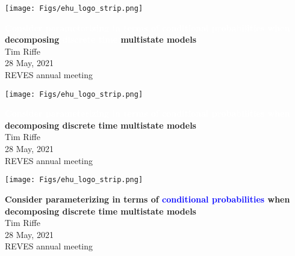 \documentclass[20pt,usenames,dvipsnames]{beamer}
\newcommand{\white}[1]{\textcolor{white}{#1}}
\newcommand{\blue}[1]{\textcolor{blue}{#1}}
\begin{document}

\begin{frame}[plain]
	\vspace{.5cm}
 \centerline{\texttt{[image: Figs/ehu\_logo\_strip.png]}}

	\huge
	\vspace{1em}
	\textbf{\white{Consider parameterizing in terms of conditional probabilities when} decomposing \white{discrete time} multistate models}\\
	\vspace{1em}
	\large 
	Tim Riffe \\
	\vspace{1em}
	28 May, 2021\\
	REVES annual meeting
\end{frame}

\begin{frame}[plain]
	\vspace{.5cm}
 \centerline{\texttt{[image: Figs/ehu\_logo\_strip.png]}}

	\huge
	\vspace{1em}
	\textbf{\white{Consider parameterizing in terms of conditional probabilities when} decomposing discrete time multistate models}\\
	\vspace{1em}
	\large 
	Tim Riffe \\
	\vspace{1em}
	28 May, 2021\\
	REVES annual meeting
\end{frame}



\begin{frame}[plain]
	\vspace{.5cm}
 \centerline{\texttt{[image: Figs/ehu\_logo\_strip.png]}}

	\huge
	\vspace{1em}
	
	\textbf{Consider parameterizing in terms of \blue{conditional probabilities} when decomposing discrete time multistate models}\\
	\vspace{1em}
	\large 
	Tim Riffe \\
	\vspace{1em}
	28 May, 2021\\
	REVES annual meeting
\end{frame}
\end{document}
